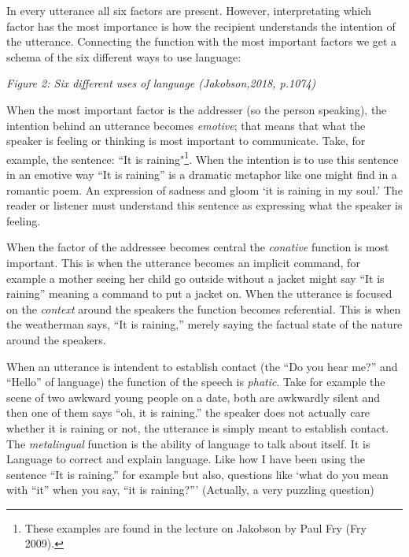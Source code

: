 \noindent In every utterance all six factors are present. However, interpretating which factor has the most importance is how the recipient understands the intention of the utterance. Connecting the function with the most important factors we get a schema of the six different ways to use language: 

\vspace{0.3cm}

\small
{}

{\it \footnotesize Figure 2: Six different uses of language (Jakobson,2018, p.1074)}

\vspace{0.3cm}


When the most important factor is the addresser (so the person speaking), the intention behind an utterance becomes \textit{emotive}; that means that what the speaker is feeling or thinking is most important to communicate. Take, for example, the sentence: “It is raining"\footnote{These examples are found in the lecture on Jakobson by Paul Fry (Fry 2009).}. When the intention is to use this sentence in an emotive way “It is raining” is a dramatic metaphor like one might find in a romantic poem. An expression of sadness and gloom ‘it is raining in my soul.’ The reader or listener must understand this sentence as expressing what the speaker is feeling. 						

When the factor of the addressee becomes central the \textit{conative} function is most important. This is when the utterance becomes an implicit command, for example a mother seeing her child go outside without a jacket might say “It is raining” meaning a command to put a jacket on. 				
When the utterance is focused on the \textit{context} around the speakers the function becomes referential. This is when the weatherman says, “It is raining,” merely saying the factual state of the nature around the speakers. 				

When an utterance is intendent to establish contact (the “Do you hear me?” and “Hello” of language) the function of the speech is \textit{phatic}. Take for example the scene of two awkward young people on a date, both are awkwardly silent and then one of them says “oh, it is raining.” the speaker does not actually care whether it is raining or not, the utterance is simply meant to establish contact. 						
The \textit{metalingual} function is the ability of language to talk about itself. It is Language to correct and explain language. Like how I have been using the sentence “It is raining.” for example but also, questions like ‘what do you mean with “it” when you say, “it is raining?”’ (Actually, a very puzzling question) 							


